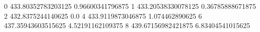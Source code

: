 0 433.80352783203125 0.96600341796875
1 433.20538330078125 0.36785888671875
2 432.8375244140625 0.0
4 433.9119873046875 1.074462890625
6 437.35943603515625 4.52191162109375
8 439.67156982421875 6.83404541015625
